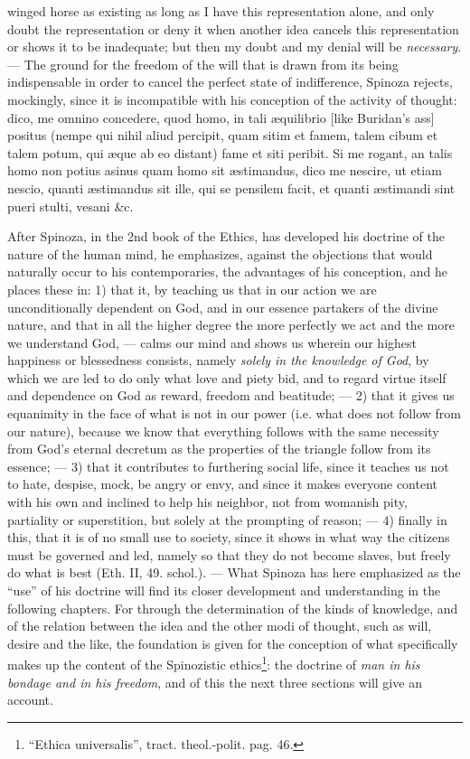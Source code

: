 \documentclass[12pt,a4paper,openany]{book}
\newcommand{\opage}[1]{\marginnote{\footnotesize\textit{[#1]}}}
\begin{document}
winged horse as existing as long as I have this representation
alone, and only doubt the representation or deny it when another
idea cancels this representation or shows it to be inadequate;
but then my doubt and my denial will be \emph{necessary}. --- The ground
for the freedom of the will that is drawn from its being indispensable in order to
cancel the perfect state of indifference, Spinoza rejects, mockingly, since it is
incompatible with his conception of the activity of thought:
dico, me omnino concedere, quod homo, in tali æquilibrio [like
Buridan's ass] positus (nempe qui nihil aliud percipit, quam sitim
et famem, talem cibum et talem potum, qui æque ab eo distant) fame
et siti peribit. Si me rogant, an talis homo non potius asinus quam
homo sit æstimandus, dico me nescire, ut etiam nescio, quanti
æstimandus sit ille, qui se pensilem facit, et quanti æstimandi sint
pueri stulti, vesani \&c.

After Spinoza, in the 2nd book of the Ethics, has developed his doctrine of the
nature of the human mind, he emphasizes, against the objections that
would naturally occur to his contemporaries, the advantages of his conception, and
he places these in: 1) that it, by teaching us that in our action
we are unconditionally dependent on God, and in our essence partakers of the
divine nature, and that in all the higher degree the
more perfectly we act and the more we understand God, --- calms our
mind and shows us wherein our highest happiness or blessedness consists,
namely \emph{solely in the knowledge of God}, by which we are led to
do only what love and piety bid, and to regard
virtue itself and
\opage{108}\setcounter{footnote}{0}dependence on God as reward, freedom and beatitude; ---
2) that it gives us equanimity in the face of what is not
in our power (i.e. what does not follow from our nature), because we know
that everything follows with the same necessity from God's eternal decretum
as the properties of the triangle follow from its essence; --- 3) that it
contributes to furthering social life, since it teaches us not to
hate, despise, mock, be angry or envy, and since it makes
everyone content with his own and inclined to help his neighbor,
not from womanish pity, partiality or superstition, but
solely at the prompting of reason; --- 4) finally in this, that it
is of no small use to society, since it shows in what
way the citizens must be governed and led, namely so that they
do not become slaves, but freely do what is best (Eth.
II, 49. schol.). --- What Spinoza has here emphasized as the ``use''
of his doctrine will find its closer development and understanding in
the following chapters. For through the determination of the kinds of knowledge,
and of the relation between the idea and the other modi of thought, such as will,
desire and the like, the foundation is given for the conception of
what specifically makes up the content of the Spinozistic
ethics\footnote{``Ethica universalis'', tract. theol.-polit. pag. 46.}:
the doctrine of \emph{man in his bondage and in his freedom}, and of
this the next three sections will give an account.
\end{document}
